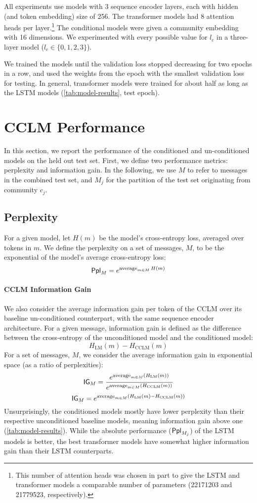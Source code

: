 \documentclass[11pt]{article}
\begin{document}
All experiments use models with \num{3} sequence encoder layers,
each with hidden (and token embedding) size of \num{256}. 
The transformer models had \num{8} attention heads per layer.\footnote{
  This number of attention heads was chosen in part to give the LSTM and transformer
  models a comparable number of parameters 
  (\num{22171203} and \num{21779523}, respectively).}
The conditional models were given a community embedding with \num{16} dimensions. 
We experimented with every possible value for $l_c$ in a three-layer model ($l_c\in\{0,1,2,3\}$).

We trained the models until the validation loss stopped decreasing for
two epochs in a row, and used the weights from the epoch with the
smallest validation loss for testing.  In general, transformer models
were trained for about half as long as the LSTM models (\cref{tab:model-results}, 
test epoch).

\section{CCLM Performance}

In this section, we report the performance of the conditioned and un-conditioned
models on the held out test set.
First, we define two performance metrics: perplexity and information gain.
In the following, we use $M$ to refer to messages in the
combined test set, and $M_j$ for the partition of the test set originating from 
community $c_j$.

\subsection{Perplexity}\label{sec:ppl}

For a given model, let $H(m)$ be the model's cross-entropy loss,
averaged over tokens in $m$.
We define the perplexity on a set of messages, $M$,
to be the exponential of the model's average cross-entropy loss:
\[\mathsf{Ppl}_M = e^{\operatorname*{average}_{m\in M} H(m)}\]

\paragraph{CCLM Information Gain}\label{sec:ig}

We also consider the average information gain per token of the CCLM over its baseline
un-conditioned counterpart, with the same sequence encoder architecture.
For a given message, information gain is defined as the difference
between the cross-entropy of the unconditioned model and the conditioned model:
\[H_{\mathrm{LM}}(m) - H_{\mathrm{CCLM}}(m)\]
For a set of messages, $M$, we consider the average information gain
in exponential space (as a ratio of perplexities):
\[\mathsf{IG}_M = \frac{e^{\operatorname*{average}_{m \in M}(H_{\mathrm{LM}}(m))}}{e^{\operatorname*{average}_{m \in M}(H_{\mathrm{CCLM}}(m))}}\]
\[\mathsf{IG}_M = {e^{\operatorname*{average}_{m \in M}(H_{\mathrm{LM}}(m) - H_{\mathrm{CCLM}}(m))}}\]
%
Unsurprisingly, the conditioned models mostly have lower perplexity 
than their respective unconditioned baseline models, 
meaning information gain above one (\cref{tab:model-results}).
While the absolute performance ($\mathsf{Ppl}_{M_j}$) of the LSTM models is better,
the best transformer models have somewhat higher information gain
than their LSTM counterparts.
\end{document}
